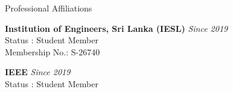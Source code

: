 \documentclass[
	11pt, %
]{resume} %
\begin{document}





\begin{rSection}{Professional Affiliations}

	\textbf{Institution of Engineers, Sri Lanka (IESL)} \hfill \textit{Since 2019} \\ 
	Status : Student Member \\
	Membership No.: S-26740

	\textbf{IEEE} \hfill \textit{Since 2019} \\ 
	Status : Student Member \\

\end{rSection}





\end{document}
